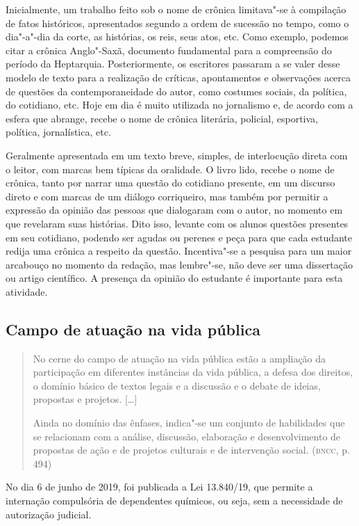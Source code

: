 \documentclass[11pt]{extarticle}
\begin{document}
Inicialmente, um trabalho feito sob o nome de crônica limitava"-se à
compilação de fatos históricos, apresentados segundo a ordem de
sucessão no tempo, como o dia"-a"-dia da corte, as histórias, os reis,
seus atos, etc. Como exemplo, podemos citar a crônica Anglo"-Saxã,
documento fundamental para a compreensão do período da Heptarquia.
Posteriormente, os escritores passaram a se valer desse modelo de
texto para a realização de críticas, apontamentos e observações acerca
de questões da contemporaneidade do autor, como costumes sociais, da
política, do cotidiano, etc. Hoje em dia é muito utilizada no
jornalismo e, de acordo com a esfera que abrange, recebe o nome de
crônica literária, policial, esportiva, política, jornalística, etc.

Geralmente apresentada em um texto breve, simples, de interlocução
direta com o leitor, com marcas bem típicas da oralidade. O livro lido,
recebe o nome de crônica, tanto por narrar uma questão do cotidiano
presente, em um discurso direto e com marcas de um diálogo corriqueiro,
mas também por permitir a expressão da opinião das pessoas que
dialogaram com o autor, no momento em que revelaram suas histórias. Dito
isso, levante com os alunos questões presentes em seu cotidiano, podendo
ser agudas ou perenes e peça para que cada estudante redija uma crônica
a respeito da questão. Incentiva"-se a pesquisa para um maior arcabouço
no momento da redação, mas lembre"-se, não deve ser uma dissertação ou
artigo científico. A presença da opinião do estudante é importante para
esta atividade.


\subsection{Campo de atuação na vida pública}

\begin{quote}
No cerne do campo de atuação na vida pública estão a ampliação da
participação em diferentes instâncias da vida pública, a defesa dos
direitos, o domínio básico de textos legais e a discussão e o debate de
ideias, propostas e projetos. {[}\ldots{}{]}

Ainda no domínio das ênfases, indica"-se um conjunto de habilidades que
se relacionam com a análise, discussão, elaboração e desenvolvimento de
propostas de ação e de projetos culturais e de intervenção social.
(\textsc{bncc}, p. 494)
\end{quote}

No dia 6 de junho de 2019, foi publicada a Lei 13.840/19, que permite
a internação compulsória de dependentes químicos, ou seja, sem a
necessidade de autorização judicial.
\end{document}
